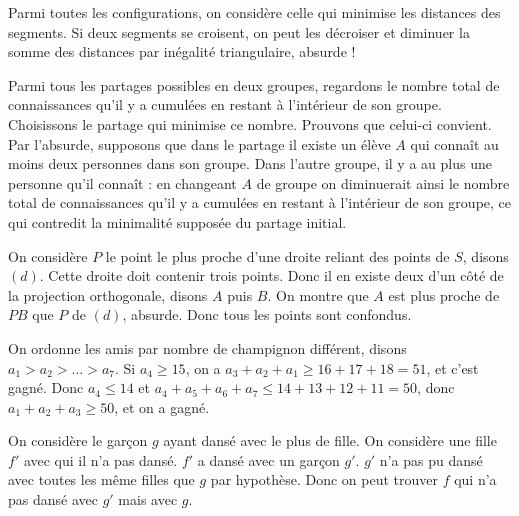 \begin{sol}
Parmi toutes les configurations, on considère celle qui minimise les distances des segments. Si deux segments se croisent, on peut les décroiser et diminuer la somme des distances par inégalité triangulaire, absurde !
\end{sol}

\begin{sol}
Parmi tous les partages possibles en deux groupes, regardons le nombre total de connaissances qu’il y a cumulées en restant à l’intérieur de son groupe. Choisissons le partage qui minimise ce nombre. Prouvons que celui-ci convient.
\newline
Par l’absurde, supposons que dans le partage il existe un élève $A$ qui connaît au moins deux personnes dans son groupe. Dans l’autre groupe, il y a au plus une personne qu’il connaît : en changeant $A$ de groupe on diminuerait ainsi le nombre total de connaissances qu’il y a cumulées en restant à l’intérieur de son groupe, ce qui contredit la minimalité supposée du partage initial.
\end{sol}

\begin{sol}
 On considère $P$ le point le plus proche d'une droite reliant des points de $S$, disons $(d)$. Cette droite doit contenir trois points. Donc il en existe deux d'un côté de la projection orthogonale, disons $A$ puis $B$. On montre que $A$ est plus proche de $PB$ que $P$ de $(d)$, absurde. Donc tous les points sont confondus.
\end{sol}

\begin{sol}
On ordonne les amis par nombre de champignon différent, disons $a_1>a_2>\dots>a_7$. Si $a_4\ge 15$, on a $a_3+a_2+a_1\ge 16+17+18=51$, et c'est gagné. Donc $a_4\le 14$ et $a_4+a_5+a_6+a_7\le 14+13+12+11=50$, donc $a_1+a_2+a_3\ge 50$, et on a gagné.
\end{sol}

\begin{sol}
On considère le garçon $g$ ayant dansé avec le plus de fille. On considère une fille $f'$ avec qui il n'a pas dansé. $f'$ a dansé avec un garçon $g'$. $g'$ n'a pas pu dansé avec toutes les même filles que $g$ par hypothèse. Donc on peut trouver $f$ qui n'a pas dansé avec $g'$ mais avec $g$.
\end{sol}
